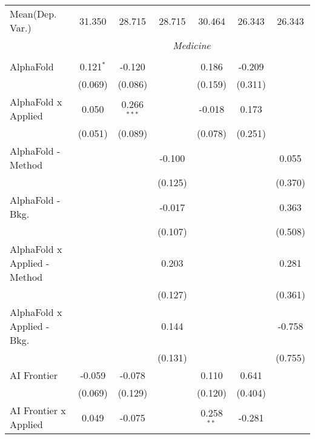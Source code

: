 \begin{tabular}{lcccccc}
Mean(Dep. Var.) & 31.350 & 28.715 & 28.715 & 30.464 & 26.343 & 26.343 \\
 & \multicolumn{6}{c}{\textit{Medicine}} \\ \\
   AlphaFold                      & 0.121$^{*}$   & -0.120        &             & 0.186         & -0.209  &   \\   
                                  & (0.069)       & (0.086)       &             & (0.159)       & (0.311) &   \\   
   AlphaFold x Applied            & 0.050         & 0.266$^{***}$ &             & -0.018        & 0.173   &   \\   
                                  & (0.051)       & (0.089)       &             & (0.078)       & (0.251) &   \\   
   AlphaFold - Method             &               &               & -0.100      &               &         & 0.055\\   
                                  &               &               & (0.125)     &               &         & (0.370)\\   
   AlphaFold - Bkg.               &               &               & -0.017      &               &         & 0.363\\   
                                  &               &               & (0.107)     &               &         & (0.508)\\   
   AlphaFold x Applied - Method   &               &               & 0.203       &               &         & 0.281\\   
                                  &               &               & (0.127)     &               &         & (0.361)\\   
   AlphaFold x Applied - Bkg.     &               &               & 0.144       &               &         & -0.758\\   
                                  &               &               & (0.131)     &               &         & (0.755)\\   
   AI Frontier                    & -0.059        & -0.078        &             & 0.110         & 0.641   &   \\   
                                  & (0.069)       & (0.129)       &             & (0.120)       & (0.404) &   \\   
   AI Frontier x Applied          & 0.049         & -0.075        &             & 0.258$^{**}$  & -0.281  &   \\   

\end{tabular}
